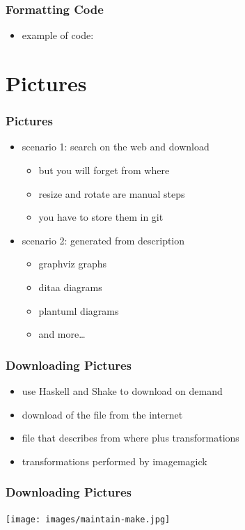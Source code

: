 \documentclass{beamer}
\begin{document}
\begin{frame}
  \frametitle{Formatting Code}
  \begin{itemize}
  \item example of code:
  \end{itemize}
\end{frame}

\section{Pictures}

\begin{frame}
  \frametitle{Pictures}
  \begin{itemize}
  \item scenario 1: search on the web and download
    \begin{itemize}
    \item but you will forget from where
    \item resize and rotate are manual steps
    \item you have to store them in git
    \end{itemize}
  \item scenario 2: generated from description
    \begin{itemize}
    \item graphviz graphs
    \item ditaa diagrams
    \item plantuml diagrams
    \item and more\ldots{}
    \end{itemize}
  \end{itemize}
\end{frame}

\begin{frame}
  \frametitle{Downloading Pictures}
  \begin{itemize}
  \item use Haskell and Shake to download on demand
  \item download of the file from the internet
  \item file that describes from where plus transformations
  \item transformations performed by imagemagick
  \end{itemize}
\end{frame}

\begin{frame}
  \frametitle{Downloading Pictures}
  \begin{center}
    \texttt{[image: images/maintain-make.jpg]}
  \end{center}
\end{frame}
\end{document}
